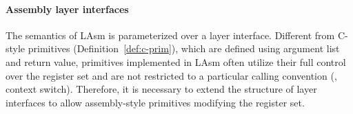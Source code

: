 
\paragraph{Assembly layer interfaces}
The semantics of LAsm is parameterized over a layer interface.
Different from C-style primitives (\cf Definition~\ref{def:c-prim}), which are defined using
argument list and return value, primitives implemented in LAsm
often utilize their full control over the
register set and are not restricted to a particular calling convention (\eg, context switch).
Therefore, it is necessary to extend the structure of layer
interfaces to allow assembly-style primitives modifying the register set.

